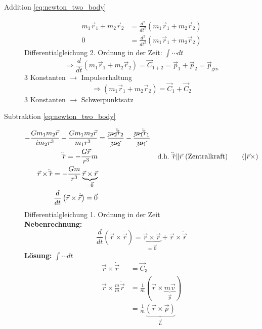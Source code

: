 \begin{description}
    \item[Addition \autoref{eq:newton_two_body}]
        \begin{align*}
            m_1\vec{r}_1 + m_2\vec{r}_2 &= \frac{d^2}{dt^2} (m_1 \vec{r}_1 + m_2 \vec{r}_2) \\
                                      0 &= \frac{d^2}{dt^2} (m_1 \vec{r}_1 + m_2 \vec{r}_2)
        \end{align*}
        Differentialgleichung 2. Ordnung in der Zeit: $\int \cdots dt$
        \[ \Rightarrow \frac{d}{dt} (m_1 \vec{r}_1 + m_2 \vec{r}_2) = \vec{C}_{1+2} = \vec{p}_1 + \vec{p}_2 = \vec{p}_{\text{ges}} \]
        3 Konstanten $\rightarrow$ Impulserhaltung
        \[ \Rightarrow (m_1 \vec{r}_1 + m_2 \vec{r}_2) = \vec{C}_1 + \vec{C}_2 \]
        3 Konstanten $\rightarrow$ Schwerpunktsatz
    \item[Subtraktion \autoref{eq:newton_two_body}]
        \begin{align*}
            -\frac{G m_1 m_2 \vec r}{i m_2 r^3} - \frac{G m_1 m_2 \vec r}{m_1 r^3} &= \frac{\cancel{m_2} \ddot \vec{r}_2}{\cancel{m_2}} - \frac{\cancel{m_1} \ddot \vec{r}_1}{\cancel{m_1}} \\
            \ddot \vec{r} = - \frac{G \vec r}{r^3} m && \text{d.h. $\ddot \vec{r} \| \vec r$ (Zentralkraft)} \tag{$| \vec r \times$}\\
            \vec r \times \ddot \vec{r} = - \frac{Gm}{r^3} \underbrace{\vec r \times \vec r}_{= \vec 0} \\
            \frac{d}{dt} \left(\vec r \times \dot{\vec{r}}\right) = \vec 0
        \end{align*}
        Differentialgleichung 1. Ordnung in der Zeit\\[1em]
        \color{OliveGreen}
        \textbf{Nebenrechnung:}
        \[ \frac{d}{dt} (\vec r \times \dot{\vec{r}}) = \underbrace{\dot{\vec{r}} \times \dot{\vec{r}}}_{= \vec 0} + \vec r \times \ddot \vec{r} \tag{Produktregel} \]
        \color{black}
        \textbf{Lösung:} $\int \cdots dt$
        \begin{align*}
            \vec r \times \dot{\vec{r}}             &= \vec{C}_3 \\
            \vec r \times \frac{m}{m} \dot{\vec{r}} &= \frac{1}{m} (\vec r \times \underbrace{m \vec v}_{\vec p})\\
                                                    &= \frac{1}{m} \underbrace{(\vec r \times \vec p)}_{\vec L} \tag{$\vec L$: Drehimpuls}
        \end{align*}

\end{description}
